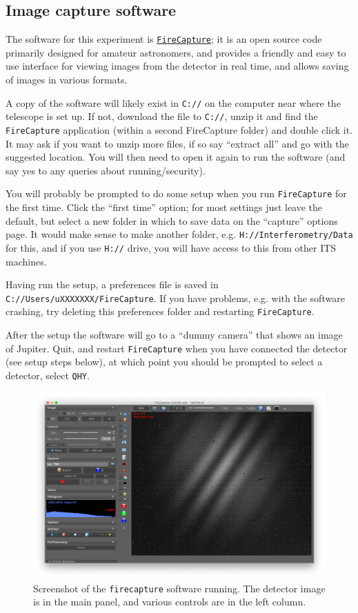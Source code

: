 \documentclass[11pt]{article}
\begin{document}
\subsection{Image capture software}\label{sec:software}

The software for this experiment is \href{http://www.firecapture.de/}{\texttt{FireCapture}}; it is an open source code primarily designed for amateur astronomers, and provides a friendly and easy to use interface for viewing images from the detector in real time, and allows saving of images in various formats.

A copy of the software will likely exist in \texttt{C://} on the computer near where the telescope is set up. If not, download the file to \texttt{C://}, unzip it and find the \texttt{FireCapture} application (within a second FireCapture folder) and double click it. It may ask if you want to unzip more files, if so say ``extract all'' and go with the suggested location. You will then need to open it again to run the software (and say yes to any queries about running/security).

You will probably be prompted to do some setup when you run \texttt{FireCapture} for the first time. Click the ``first time'' option; for most settings just leave the default, but select a new folder in which to save data on the ``capture'' options page. It would make sense to make another folder, e.g. \texttt{H://Interferometry/Data} for this, and if you use \texttt{H://} drive, you will have access to this from other ITS machines.

Having run the setup, a preferences file is saved in \texttt{C://Users/uXXXXXXX/FireCapture}. If you have problems, e.g. with the software crashing, try deleting this preferences folder and restarting \texttt{FireCapture}.

After the setup the software will go to a ``dummy camera'' that shows an image of Jupiter. Quit, and restart \texttt{FireCapture} when you have connected the detector (see setup steps below), at which point you should be prompted to select a detector, select \texttt{QHY}.

\begin{figure}[h]
    \centering
    \includegraphics[width=1\textwidth]{doc/fc.png}
    \caption{Screenshot of the \texttt{firecapture} software running. The detector image is in the main panel, and various controls are in the left column.}
    \label{fig:fc}
\end{figure}
\end{document}
